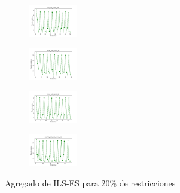 \begin{figure}[H]
\begin{subfigure}
    \end{subfigure}
    \hfill
    \begin{subfigure}
        \centering
        \includegraphics[width=0.234\textwidth]{img/ils-es/iris_set_const_20_3773969821_cost.png}
    \end{subfigure}
    \hfill
    \begin{subfigure}
        \centering
        \includegraphics[width=0.234\textwidth]{img/ils-es/ecoli_set_const_20_3773969821_cost.png}
    \end{subfigure}
    \hfill
    \begin{subfigure}
        \centering
        \includegraphics[width=0.234\textwidth]{img/ils-es/rand_set_const_20_3773969821_cost.png}
    \end{subfigure}
    \hfill
    \begin{subfigure}
        \centering
        \includegraphics[width=0.234\textwidth]{img/ils-es/newthyroid_set_const_20_3773969821_cost.png}
    \end{subfigure}
    \caption{Agregado de ILS-ES para 20\% de restricciones}
\end{figure}

\vspace*{\fill}
\newpage

